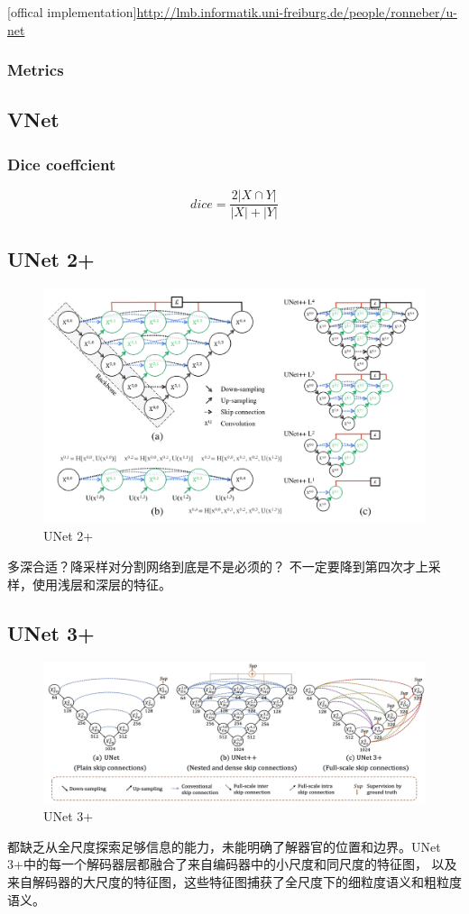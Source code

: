 [offical implementation]\url{http://lmb.informatik.uni-freiburg.de/people/ronneber/u-net}

\subsubsection{Metrics}

\subsection{VNet}

\subsubsection{Dice coeffcient}
\[
dice = \frac{2|X \cap Y |}{|X| + |Y|}
\]


\subsection{UNet 2+}

\begin{figure}[H]
    \centering
    \includegraphics[width=14cm]{images/unet2+.png}
    \caption{UNet 2+}
    \label{fig:unet2p}
\end{figure}

多深合适？降采样对分割网络到底是不是必须的？
不一定要降到第四次才上采样，使用浅层和深层的特征。

\subsection{UNet 3+}

\begin{figure}[H]
    \centering
    \includegraphics[width=14cm]{images/unet3+.png}
    \caption{UNet 3+}
    \label{fig:unet3p}
\end{figure}
都缺乏从全尺度探索足够信息的能力，未能明确了解器官的位置和边界。UNet 3+中的每一个解码器层都融合了来自编码器中的小尺度和同尺度的特征图，
以及来自解码器的大尺度的特征图，这些特征图捕获了全尺度下的细粒度语义和粗粒度语义。
